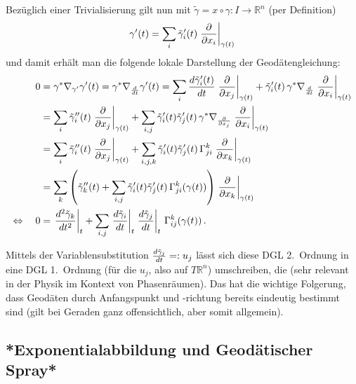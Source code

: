 Bezüglich einer Trivialisierung gilt nun mit $\tilde{\gamma} = x \circ \gamma: I \rightarrow \mathbb{R}^n$ (per Definition)
\begin{equation*}
\gamma'(t) = \sum_i \tilde{\gamma}_i'(t) \eval{\pdv{x_i}}_{\gamma(t)}
\end{equation*}
und damit erhält man die folgende lokale Darstellung der Geodätengleichung:
\begin{align}
0 &= \gamma^* \nabla_{\gamma'} \gamma'(t) = \gamma^* \nabla_{\dv{t}} \gamma'(t) = \sum_i \dv{\tilde{\gamma}_i'(t)}{t} \eval{\pdv{x_j}}_{\gamma(t)} + \tilde{\gamma}_i'(t) \, \gamma^* \nabla_{\dv{t}} \eval{\pdv{x_i}}_{\gamma(t)}
\notag\\
&= \sum_i \tilde{\gamma}_i''(t) \eval{\pdv{x_j}}_{\gamma(t)} + \sum_{i, j} \tilde{\gamma}_i'(t) \tilde{\gamma}_j'(t) \, \gamma^* \nabla_{\pdv{x_j}} \eval{\pdv{x_i}}_{\gamma(t)}
\notag\\
&= \sum_i \tilde{\gamma}_i''(t) \eval{\pdv{x_j}}_{\gamma(t)} + \sum_{i, j, k} \tilde{\gamma}_i'(t) \tilde{\gamma}_j'(t) \, \Gamma_{ji}^k \eval{\pdv{x_k}}_{\gamma(t)}
\notag\\
&= \sum_k \qty(\tilde{\gamma}_k''(t) + \sum_{i, j} \tilde{\gamma}_i'(t) \tilde{\gamma}_j'(t) \, \Gamma_{ji}^k(\gamma(t))) \eval{\pdv{x_k}}_{\gamma(t)}
\notag\\
\Leftrightarrow \quad 0 &= \eval{\dv[2]{\tilde{\gamma}_k}{t}}_t + \sum_{i, j} \eval{\dv{\tilde{\gamma}_i}{t}}_t \eval{\dv{\tilde{\gamma}_j}{t}}_t \, \Gamma_{ij}^k(\gamma(t)) \, .
\end{align}

Mittels der Variablensubstitution $\dv{\tilde{\gamma}_j}{t} =: u_j$ lässt sich diese DGL 2.~Ordnung in eine DGL 1.~Ordnung (für die $u_j$, also auf $T \mathbb{R}^n$) umschreiben, die  (sehr relevant in der Physik im Kontext von Phasenräumen). Das hat die wichtige Folgerung, dass Geodäten durch Anfangspunkt und -richtung bereits eindeutig bestimmt sind (gilt bei Geraden ganz offensichtlich, aber somit allgemein).\\



		\subsection{*Exponentialabbildung und Geodätischer Spray*}


